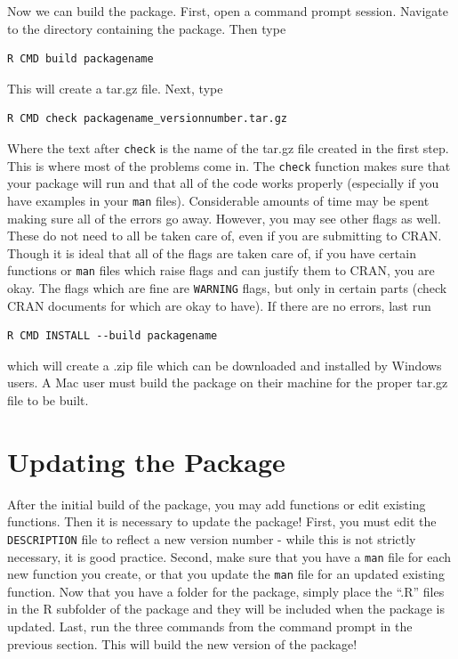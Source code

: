 \documentclass{article}
\begin{document}
Now we can build the package. First, open a command prompt session. Navigate to the directory containing the package. Then type
\begin{verbatim}
R CMD build packagename
\end{verbatim}
This will create a tar.gz file. Next, type
\begin{verbatim}
R CMD check packagename_versionnumber.tar.gz
\end{verbatim}
Where the text after \texttt{check} is the name of the tar.gz file created in the first step. This is where most of the problems come in. The \texttt{check} function makes sure that your package will run and that all of the code works properly (especially if you have examples in your \texttt{man} files). Considerable amounts of time may be spent making sure all of the errors go away. However, you may see other flags as well. These do not need to all be taken care of, even if you are submitting to CRAN. Though it is ideal that all of the flags are taken care of, if you have certain functions or \texttt{man} files which raise flags and can justify them to CRAN, you are okay. The flags which are fine are \texttt{WARNING} flags, but only in certain parts (check CRAN documents for which are okay to have). If there are no errors, last run
\begin{verbatim}
R CMD INSTALL --build packagename
\end{verbatim}
which will create a .zip file which can be downloaded and installed by Windows users. A Mac user must build the package on their machine for the proper tar.gz file to be built. 

\section{Updating the Package}
After the initial build of the package, you may add functions or edit existing functions. Then it is necessary to update the package! First, you must edit the \texttt{DESCRIPTION} file to reflect a new version number - while this is not strictly necessary, it is good practice. Second, make sure that you have a \texttt{man} file for each new function you create, or that you update the \texttt{man} file for an updated existing function. Now that you have a folder for the package, simply place the ``.R'' files in the R subfolder of the package and they will be included when the package is updated. Last, run the three commands from the command prompt in the previous section. This will build the new version of the package!
\end{document}
